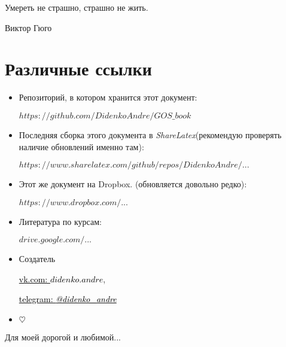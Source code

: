 \epigraph{Умереть не страшно, страшно не жить.}{Виктор Гюго}

{\let\clearpage\relax\chapter{Различные ссылки}}
\begin{itemize}
\item

Репозиторий, в котором хранится этот документ:

\href{https://github.com/DidenkoAndre/GOS_book}{$https://github.com/DidenkoAndre/GOS\_book$}

\item
Последняя сборка этого документа в \textit{ShareLatex}\newline (рекомендую проверять наличие обновлений именно там): 

\href{https://www.sharelatex.com/github/repos/DidenkoAndre/GOS_book/builds/latest/output.pdf}{$https://www.sharelatex.com/github/repos/DidenkoAndre/...$}

\item

Этот же документ на Dropbox.  \newline (обновляется довольно редко):

\href{https://www.dropbox.com/sh/7e5mfj8q68o2ipp/AAD8XvpZhiJzFbEh_IeH305ia?dl=0&preview=GOSBook.pdf}{$https://www.dropbox.com/...$}

\item
Литература по курсам:

\href{https://drive.google.com/drive/u/0/folders/0BzuzEyNkpwYDcENXcV9jNWdwVlU}{$drive.google.com/...$}

\item
Создатель

\href{https://vk.com/didenko.andre}{\textcolor{black}{vk.com: \textcolor{Purplemountainmajesty}{$didenko.andre$}}},

\href{https://telegram.me/didenko_andre}{\textcolor{black}{telegram: \textcolor{Purplemountainmajesty}{\textit{@didenko_andre}}}}

\item

$\heartsuit$
\end{itemize}

\newpage
\epigraph{Для моей дорогой и любимой...}{}